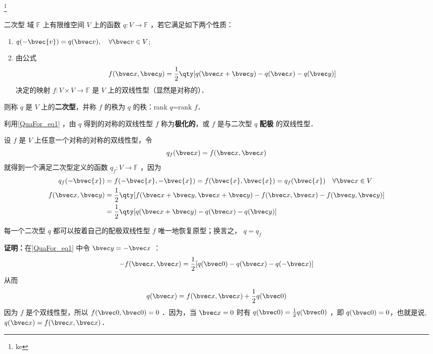 
\begin{issues}
\issueTODO
\end{issues}

\footnote{ke}\begin{definition}{二次型}
域 $\mathbb{F}$ 上有限维空间 $V$ 上的函数 $q:V\rightarrow\mathbb{F}$ ，若它满足如下两个性质：
\begin{enumerate}
\item $q(-\bvec{v})=q(\bvec v),\quad \forall\bvec v\in V$;
\item 由公式
\begin{equation}\label{QuaFor_eq1}
f(\bvec x,\bvec y)=\frac{1}{2}\qty[q(\bvec x+\bvec y)-q(\bvec x)-q(\bvec y)]
\end{equation}
决定的映射 $f:V\times V\rightarrow\mathbb{F}$ 是 $V$ 上的双线性型（显然是对称的）．
\end{enumerate}
则称 $q$ 是 $V$ 上的\textbf{二次型}，并称 $f$ 的秩为 $q$ 的秩：rank $q$=rank $f$．
\end{definition}
利用\autoref{QuaFor_eq1} ，由 $q$ 得到的对称的双线性型 $f$ 称为\textbf{极化的}，或 $f$ 是与二次型 $q$ \textbf{配极} 的双线性型．
\begin{example}{}
设 $f$ 是 $V$ 上任意一个对称的对称的双线性型，令
\begin{equation}
q_f(\bvec x)=f(\bvec x,\bvec x)
\end{equation}
就得到一个满足二次型定义的函数 $q_f:V\rightarrow\mathbb{F}$ ，因为
\begin{equation}
\begin{aligned}
q_f(-\bvec{x})&=f(-\bvec{x},-\bvec{x})=f(\bvec{x},\bvec{x})=q_f(\bvec{x}) \quad \forall\bvec x\in V\\
f(\bvec x,\bvec y)&=\frac{1}{2}\qty[f(\bvec x+\bvec y,\bvec x+\bvec y)-f(\bvec x,\bvec x)-f(\bvec y,\bvec y)]\\
&=\frac{1}{2}\qty[q(\bvec x+\bvec y)-q(\bvec x)-q(\bvec y)]
\end{aligned}
\end{equation}
\end{example}
\begin{theorem}{}\label{QuaFor_the1}
每一个二次型 $q$ 都可以按着自己的配极双线性型 $f$ 唯一地恢复原型；换言之， $q=q_f$
\end{theorem}
\textbf{证明：}在\autoref{QuaFor_eq1} 中令 $\bvec y=-\bvec x$ ：
\begin{equation}
-f(\bvec x,\bvec x)=\frac{1}{2}[q(\bvec 0)-q(\bvec x)-q(-\bvec x)]
\end{equation}
从而
\begin{equation}
q(\bvec x)=f(\bvec x,\bvec x)+\frac{1}{2}q(\bvec 0)
\end{equation}
因为 $f$ 是个双线性型，所以 $f(\bvec 0,\bvec 0)=0$ ．因为，当 $\bvec x=0$ 时有 $q(\bvec 0)=\frac{1}{2}q(\bvec 0)$ ，即 $q(\bvec 0)=0$，也就是说, $q(\bvec x)=f(\bvec x,\bvec x)$．

